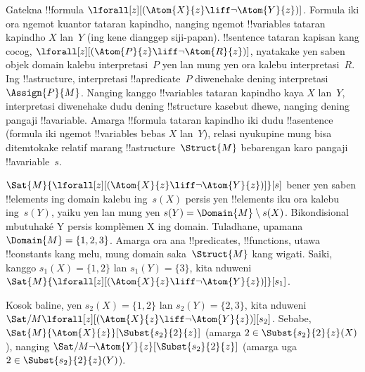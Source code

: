 \documentclass[../../../include/open-logic-section]{subfiles}
\begin{document}
\begin{ex}
  Gatekna !!{formula}
  $\lforall[z][(\Atom{X}{z} \liff \lnot \Atom{Y}{z})]$.
  Formula iki ora ngemot kuantor tataran kapindho, nanging ngemot
  !!{variable}s tataran kapindho $X$ lan~$Y$ (ing kene dianggep
  siji-papan). !!{sentence} tataran kapisan kang cocog,
  $\lforall[z][(\Atom{P}{z} \liff \lnot \Atom{R}{z})]$,
  nyatakake yen saben objek domain kalebu interpretasi~$P$ yen lan mung yen ora kalebu interpretasi~$R$. Ing
  !!a{structure}, interpretasi !!a{predicate}~$P$
  diwenehake dening interpretasi~$\Assign{P}{M}$. Nanging
  kanggo !!{variable}s tataran kapindho kaya $X$ lan~$Y$,
  interpretasi diwenehake dudu dening !!{structure} kasebut
  dhewe, nanging dening pangaji !!a{variable}. Amarga
  !!{formula} tataran kapindho iki dudu !!a{sentence} (formula iki
  ngemot !!{variable}s bebas $X$ lan~$Y$), relasi nyukupine
  mung bisa ditemtokake relatif marang
  !!a{structure}~$\Struct{M}$ bebarengan karo pangaji
  !!a{variable}~$s$.

  $\Sat{M}{\lforall[z][(\Atom{X}{z} \liff \lnot \Atom{Y}{z})]}[s]$
  bener yen saben !!{element}s ing domain kalebu ing~$s(X)$ persis yen
  !!{element}s iku ora kalebu ing~$s(Y)$, yaiku yen lan mung yen
  $s(Y) = \Domain{M} \setminus s(X)$. Bikondisional mbutuhaké Y persis komplèmen X ing domain. Tuladhane, upamana
  $\Domain{M} = \{1, 2, 3\}$. Amarga ora ana !!{predicate}s,
  !!{function}s, utawa !!{constant}s kang melu, mung domain
  saka~$\Struct{M}$ kang wigati. Saiki, kanggo
  $s_1(X) = \{1, 2\}$ lan $s_1(Y) = \{3\}$, kita nduweni
  $\Sat{M}{\lforall[z][(\Atom{X}{z}
      \liff \lnot \Atom{Y}{z})]}[s_1]$.

  Kosok baline, yen $s_2(X) = \{1, 2\}$ lan
  $s_2(Y) = \{2, 3\}$, kita nduweni
  $\Sat/{M}{\lforall[z][(\Atom{X}{z} \liff \lnot
      \Atom{Y}{z})]}[s_2]$. Sebabe,
  $\Sat{M}{\Atom{X}{z}}[\Subst{s_2}{2}{z}]$ (amarga
  $2 \in \Subst{s_2}{2}{z}(X)$), nanging
  $\Sat/{M}{\lnot \Atom{Y}{z}}[\Subst{s_2}{2}{z}]$
  (amarga uga $2 \in \Subst{s_2}{2}{z}(Y)$).
\end{ex}
\end{document}
